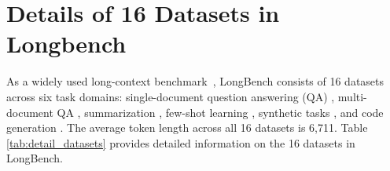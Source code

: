 \section{Details of 16 Datasets in Longbench}
\label{apdx:details_datasets}

 As a widely used long-context benchmark~\cite{ada,SnapKV,pyramidkv}, LongBench consists of 16 datasets across six task domains: single-document question answering (QA) \citep{kovcisky2018narrativeqa,dasigi2021dataset}, multi-document QA \citep{multi_hop1,ho-etal-2020-constructing,trivedi2022musique}, summarization \citep{huang2021efficient,zhong2021qmsum,fabbri2019multi}, few-shot learning \citep{joshi2017triviaqalargescaledistantly,gliwa2019samsum,li2002learning}, synthetic tasks \citep{bai2023longbench}, and code generation \citep{guo2023longcoderlongrangepretrainedlanguage,liu2023repobenchbenchmarkingrepositorylevelcode}. The average token length across all 16 datasets is 6,711. Table \ref{tab:detail_datasets} provides detailed information on the 16 datasets in LongBench.


